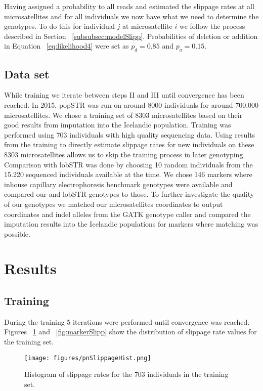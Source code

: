 \documentclass{bioinfo}
\begin{document}
    Having assigned a probability to all reads and estimated the slippage rates at all microsatellites and for all individuals we now have what we need to determine the genotypes. To do this for individual $j$ at microsatellite $i$ we follow the process described in Section ~\ref{subsubsec:modelSlipp}. Probabilities of deletion or addition in Equation ~\ref{eq:likelihood4} were set as $p_d = 0.85$ and $p_a = 0.15$. 
\subsection{Data set}
 While training we iterate between steps II and III until convergence has been reached. In 2015, popSTR was run on around 8000 individuals for around 700.000 microsatellites. We chose a training set of 8303 microsatellites based on their good results from imputation into the Icelandic population. Training was performed using 703 individuals with high quality sequencing data.
 Using results from the training to directly estimate slippage rates for new individuals on these 8303 microsatellites allows us to skip the training process in later genotyping. 
 Comparison with lobSTR was done by choosing 10 random individuals from the 15.220 sequenced individuals available at the time. We chose 146 markers where inhouse capillary electrophoresis benchmark genotypes were available and compared our and lobSTR genotypes to those.
 To further investigate the quality of our genotypes we matched our microsatellites coordinates to output coordinates and indel alleles from the GATK genotype caller and compared the imputation results into the Icelandic populations for markers where matching was possible. 
 
\section{Results}
\subsection{Training}
During the training 5 iterations were performed until convergence was reached. Figures ~\ref{fig:pnSlipp} and ~\ref{fig:markerSlipp} show the distribution of slippage rate values for the training set.
\begin{figure}[H]
\centering
 \texttt{[image: figures/pnSlippageHist.png]}
  \caption[Histogram of pn-slippage]{Histogram of slippage rates for the 703 individuals in the training set.}
 \label{fig:pnSlipp}
\end{figure}
\end{document}
